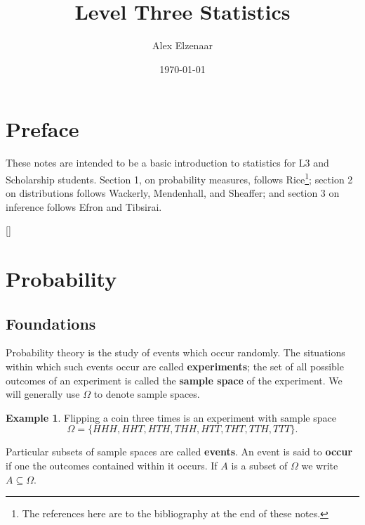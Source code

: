 \documentclass[a4paper,leqno]{article}
\title{Level Three Statistics}
\author{Alex Elzenaar}
\date{\today}
\numberwithin{equation}{section}
\theoremstyle{definition}
\newtheorem{ex}[equation]{Example}
\theoremstyle{remark}
\newcommand{\df}{\textbf}
\begin{document}
\maketitle
\tableofcontents
\section*{Preface}
These notes are intended to be a basic introduction to statistics for L3 and Scholarship students. Section 1, on probability measures, follows
Rice\footnote{The references here are to the bibliography at the end of these notes.}; section 2 on distributions follows Wackerly, Mendenhall,
and Sheaffer; and section 3 on inference follows Efron and Tibsirai.

[{\titlerule[0.8pt]}]
\let\oldsection\section
\renewcommand\section{\clearpage\oldsection}
\section{Probability}
\subsection{Foundations}
Probability theory is the study of events which occur randomly. The situations within which such events occur are called \df{experiments}; the set
of all possible outcomes of an experiment is called the \df{sample space} of the experiment. We will generally use $ \Omega $ to denote sample
spaces.

\begin{ex}
  Flipping a coin three times is an experiment with sample space
  \begin{displaymath}
    \Omega = \{HHH, HHT, HTH, THH, HTT, THT, TTH, TTT\}.
  \end{displaymath}
\end{ex}

Particular subsets of sample spaces are called \df{events}. An event is said to \df{occur} if
one the outcomes contained within it occurs. If $ A $ is a subset of $ \Omega $ we write $ A \subseteq \Omega $.
\end{document}
